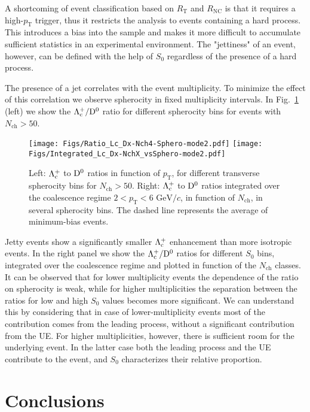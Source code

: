 \documentclass[aps,amsmath,amssymb,a4paper,11pt,superscriptaddress]{revtex4-2}
\newcommand*{\Nch}{\ensuremath{N_\mathrm{ch}}\xspace}
\newcommand*{\RT}{\ensuremath{R_\mathrm{T}}\xspace}
\newcommand*{\RNC}{\ensuremath{R_\mathrm{NC}}\xspace}
\newcommand*{\SO}{\ensuremath{S_\mathrm{0}}\xspace}
\newcommand*{\pT}{\ensuremath{p_\mathrm{T}}\xspace}
\newcommand*{\GeVc}{\ensuremath{\mathrm{GeV}/c}\xspace}
\newcommand*{\Lc}{\ensuremath{\Lambda_{\rm c}^+}\xspace}
\newcommand*{\Dz}{\ensuremath{\rm D^0}\xspace}
\newcommand*{\LcToDz}{\ensuremath{{\Lambda_{\rm c}^+}/{\rm D^0}}\xspace}
\begin{document}
A shortcoming of event classification based on \RT and \RNC is that it requires a high-\pT trigger, thus it restricts the analysis to events containing a hard process. This introduces a bias into the sample and makes it more difficult to accumulate sufficient statistics in an experimental environment. The "jettiness" of an event, however, can be defined with the help of \SO regardless of the presence of a hard process. 

The presence of a jet correlates with the event multiplicity. To minimize the effect of this correlation we observe spherocity in fixed multiplicity intervals. 
In Fig.~\ref{fig:Sphero} (left) we show the \LcToDz ratio for different spherocity bins for events with $\Nch > 50$. 
%
\begin{figure}[ht!]%
\centering
\texttt{[image: Figs/Ratio\_Lc\_Dx-Nch4-Sphero-mode2.pdf]}%
\texttt{[image: Figs/Integrated\_Lc\_Dx-NchX\_vsSphero-mode2.pdf]}%
\caption{Left: \Lc to \Dz ratios in function of \pT, for different transverse spherocity bins for $\Nch>50$. Right: \Lc to \Dz ratios integrated over the coalescence regime $2<\pT<6$ \GeVc, in function of \Nch, in several spherocity bins. The dashed line represents the average of minimum-bias events.}
\label{fig:Sphero}
\end{figure}
%
Jetty events show a significantly smaller \Lc enhancement than more isotropic events.
In the right panel we show the \LcToDz ratios for different \SO bins, integrated over the coalescence regime and plotted in function of the \Nch classes. 
It can be observed that for lower multiplicity events the dependence of the ratio on spherocity is weak, while for higher multiplicities the separation between the ratios for low and high \SO values becomes more significant. We can understand this by considering that in case of lower-multiplicity events most of the contribution comes from the leading process, without a significant contribution from the UE. For higher multiplicities, however, there is sufficient room for the underlying event. In the latter case both the leading process and the UE contribute to the event, and \SO characterizes their relative proportion.

\section{Conclusions}
\label{sec:conclusions}
\end{document}
